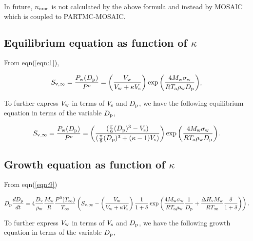 \documentclass[12pt]{article}
\begin{document}
In future, $n_{\rm ions}$ is not calculated by the above formula and instead by MOSAIC which is coupled to PARTMC-MOSAIC.



\subsection{Equilibrium equation as function of $\kappa$}

From eqn(\ref{eqn:1}),

\begin{equation}\label{eqn:19a}
S_{\rm v, \infty}=\frac{P_{\rm w}(D_{\rm p})}{P^{o}}=\left(\frac{V_{\rm w}}{V_{\rm w} + \kappa V_{\rm s}}\right)   \exp{\left(\frac{4 M_{\rm w} \sigma_{\rm w}}{R T_{\rm a} \rho_{\rm w} D_{\rm p}}\right)},
\end{equation}

To further express $V_{\rm w}$ in terms of $V_{\rm s}$ and $ D_{\rm p}$, we have the following equilibrium equation in terms of the variable $D_{\rm p}$, 

\begin{equation}\label{eqn:19b}
S_{\rm v, \infty}=\frac{P_{\rm w}(D_{\rm p})}{P^{o}}=\left(\frac{(\frac{\pi}{6}(D_{\rm p})^{3}-V_{\rm s}) }{(\frac{\pi}{6}(D_{\rm p})^{3}+(\kappa-1)V_{\rm s})}\right) \exp{\left(\frac{4 M_{\rm w} \sigma_{\rm w}}{R T_{\rm a} \rho_{\rm w} D_{\rm p}}\right)}.
\end{equation}



\subsection{Growth equation as function of $\kappa$ }

From eqn(\ref{eqn:9})

\begin{equation}\label{eqn:22a}
D_{\rm p}\frac{dD_{\rm p}}{dt}=4 \frac{D_{\rm v}} {\rho_{\rm w}} \frac{M_{\rm w}}{R} \frac{P^{\rm 0}(T_{\infty})} {T_{\infty}} \left(S_{\rm v, \infty} -  \left(\frac{V_{\rm w}}{V_{\rm w} + \kappa V_{\rm s}}\right) \frac{1}{1+\delta} \exp \left(\frac{4 M_{\rm w}\sigma_{\rm w}}{R T_{\rm a} \rho_{\rm w}}\frac{1}{D_{\rm p}}+\frac{\Delta H_{\rm v} M_{\rm w}}{R T_{\infty}} \frac{\delta}{1+\delta}\right)\right).
\end{equation}

To further express $V_{\rm w}$ in terms of $V_{\rm s}$ and $ D_{\rm p}$, we have the following growth equation in terms of the variable $D_{\rm p}$,
\end{document}
